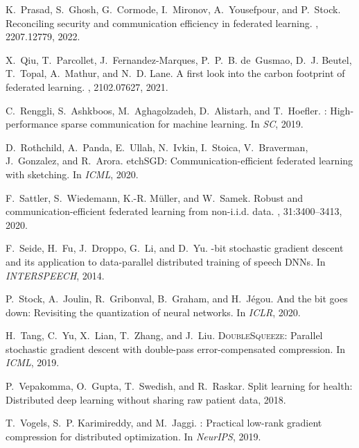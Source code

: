 \documentclass[11pt]{article}
\begin{document}
\begin{thebibliography}{10}
\begin{small}
K.~Prasad, S.~Ghosh, G.~Cormode, I.~Mironov, A.~Yousefpour, and P.~Stock.
\newblock Reconciling security and communication efficiency in federated
  learning.
, 2207.12779, 2022.

X.~Qiu, T.~Parcollet, J.~Fernandez-Marques, P.~P.~B. de~Gusmao, D.~J. Beutel,
  T.~Topal, A.~Mathur, and N.~D. Lane.
\newblock A first look into the carbon footprint of federated learning.
, 2102.07627, 2021.

C.~Renggli, S.~Ashkboos, M.~Aghagolzadeh, D.~Alistarh, and T.~Hoefler.
: High-performance sparse communication for machine
  learning.
\newblock In {\em SC}, 2019.

D.~Rothchild, A.~Panda, E.~Ullah, N.~Ivkin, I.~Stoica, V.~Braverman,
  J.~Gonzalez, and R.~Arora.
etch{SGD}: Communication-efficient federated learning with
  sketching.
\newblock In {\em ICML}, 2020.

F.~Sattler, S.~Wiedemann, K.-R. M{\"u}ller, and W.~Samek.
\newblock Robust and communication-efficient federated learning from
  non-{i.i.d.} data.
,
  31:3400--3413, 2020.

F.~Seide, H.~Fu, J.~Droppo, G.~Li, and D.~Yu.
-bit stochastic gradient descent and its application to
  data-parallel distributed training of speech {DNNs}.
\newblock In {\em {INTERSPEECH}}, 2014.

P.~Stock, A.~Joulin, R.~Gribonval, B.~Graham, and H.~Jégou.
\newblock And the bit goes down: Revisiting the quantization of neural
  networks.
\newblock In {\em ICLR}, 2020.

H.~Tang, C.~Yu, X.~Lian, T.~Zhang, and J.~Liu.
\newblock \textsc{DoubleSqueeze}: Parallel stochastic gradient descent with
  double-pass error-compensated compression.
\newblock In {\em ICML}, 2019.

P.~Vepakomma, O.~Gupta, T.~Swedish, and R.~Raskar.
\newblock Split learning for health: Distributed deep learning without sharing
  raw patient data, 2018.

T.~Vogels, S.~P. Karimireddy, and M.~Jaggi.
: Practical low-rank gradient compression for distributed
  optimization.
\newblock In {\em NeurIPS}, 2019.


\end{small}
\end{thebibliography}
\end{document}

